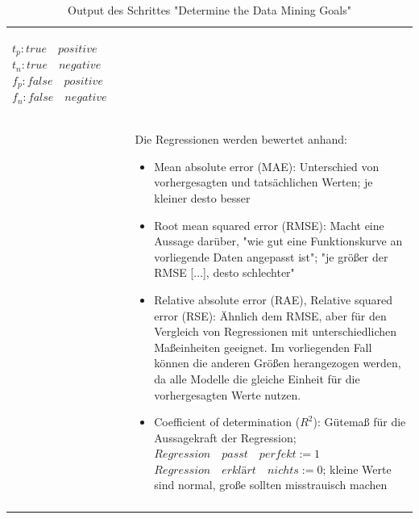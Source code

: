 \begin{longtable}[!h]{|p{}|p{12cm}|}
\begin{itemize}
\end{itemize} 
$ t_{p} : true \quad positive $ \newline
$ t_{n} : true \quad negative $ \newline
$ f_{p} : false \quad positive $ \newline
$ f_{n} : false \quad negative $ \newline
\\
& Die Regressionen werden bewertet anhand:
\begin{itemize}
\item Mean absolute error (MAE): Unterschied von vorhergesagten und tatsächlichen Werten; je kleiner desto besser\citep{mircosoft_evaluate_2017}
\item Root mean squared error (RMSE): Macht eine Aussage darüber, "wie gut eine Funktionskurve an vorliegende Daten angepasst ist"; "je größer der RMSE [...], desto schlechter"\citep{statista_root_nodate}
\item Relative absolute error (RAE), Relative squared error (RSE): Ähnlich dem RMSE, aber für den Vergleich von Regressionen mit unterschiedlichen Maßeinheiten geeignet.\citep{dr._sayad_model_2017} Im vorliegenden Fall können die anderen Größen herangezogen werden, da alle Modelle die gleiche Einheit für die vorhergesagten Werte nutzen.
\item Coefficient of determination ($ R^2 $): Gütemaß für die Aussagekraft der Regression; 
\newline
$Regression \quad passt \quad perfekt := 1$ 
\newline 
$Regression \quad erklärt \quad nichts := 0$;
\newline 
kleine Werte sind normal, große sollten misstrauisch machen\citep{mircosoft_evaluate_2017}
\end{itemize}
\\
\hline
\caption{Output des Schrittes "Determine the Data Mining Goals"}
\end{longtable}


 \newline
{} \newline
{}

